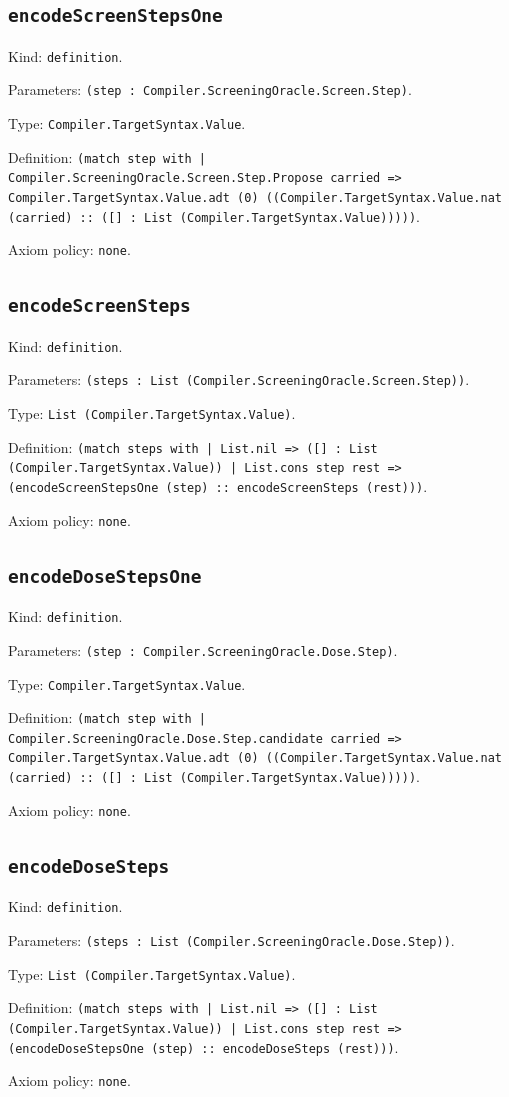 \documentclass[11pt]{article}
\begin{document}
\subsection*{\texttt{encodeScreenStepsOne}}
\noindent Kind: \texttt{definition}.\par
\noindent Parameters: \texttt{(step : Compiler.ScreeningOracle.Screen.Step)}.\par
\noindent Type: \texttt{Compiler.TargetSyntax.Value}.\par
\noindent Definition: \texttt{(match step with | Compiler.ScreeningOracle.Screen.Step.Propose carried => Compiler.TargetSyntax.Value.adt (0) ((Compiler.TargetSyntax.Value.nat (carried) :: ([] : List (Compiler.TargetSyntax.Value)))))}.\par
\noindent Axiom policy: \texttt{none}.\par
\subsection*{\texttt{encodeScreenSteps}}
\noindent Kind: \texttt{definition}.\par
\noindent Parameters: \texttt{(steps : List (Compiler.ScreeningOracle.Screen.Step))}.\par
\noindent Type: \texttt{List (Compiler.TargetSyntax.Value)}.\par
\noindent Definition: \texttt{(match steps with | List.nil => ([] : List (Compiler.TargetSyntax.Value)) | List.cons step rest => (encodeScreenStepsOne (step) :: encodeScreenSteps (rest)))}.\par
\noindent Axiom policy: \texttt{none}.\par
\subsection*{\texttt{encodeDoseStepsOne}}
\noindent Kind: \texttt{definition}.\par
\noindent Parameters: \texttt{(step : Compiler.ScreeningOracle.Dose.Step)}.\par
\noindent Type: \texttt{Compiler.TargetSyntax.Value}.\par
\noindent Definition: \texttt{(match step with | Compiler.ScreeningOracle.Dose.Step.candidate carried => Compiler.TargetSyntax.Value.adt (0) ((Compiler.TargetSyntax.Value.nat (carried) :: ([] : List (Compiler.TargetSyntax.Value)))))}.\par
\noindent Axiom policy: \texttt{none}.\par
\subsection*{\texttt{encodeDoseSteps}}
\noindent Kind: \texttt{definition}.\par
\noindent Parameters: \texttt{(steps : List (Compiler.ScreeningOracle.Dose.Step))}.\par
\noindent Type: \texttt{List (Compiler.TargetSyntax.Value)}.\par
\noindent Definition: \texttt{(match steps with | List.nil => ([] : List (Compiler.TargetSyntax.Value)) | List.cons step rest => (encodeDoseStepsOne (step) :: encodeDoseSteps (rest)))}.\par
\noindent Axiom policy: \texttt{none}.\par
\end{document}
